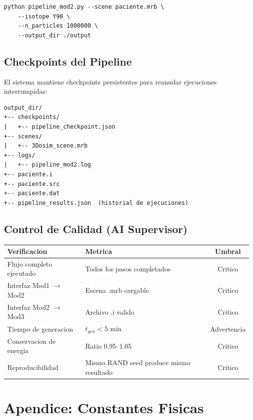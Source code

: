 \documentclass[12pt,a4paper]{article}
\begin{document}
\begin{verbatim}
python pipeline_mod2.py --scene paciente.mrb \
    --isotope Y90 \
    --n_particles 1000000 \
    --output_dir ./output
\end{verbatim}

\subsection{Checkpoints del Pipeline}

El sistema mantiene checkpoints persistentes para reanudar ejecuciones interrumpidas:

\begin{verbatim}
output_dir/
+-- checkpoints/
|   +-- pipeline_checkpoint.json
+-- scenes/
|   +-- 3Dosim_scene.mrb
+-- logs/
|   +-- pipeline_mod2.log
+-- paciente.i
+-- paciente.src
+-- paciente.dat
+-- pipeline_results.json  (historial de ejecuciones)
\end{verbatim}

\subsection{Control de Calidad (AI Supervisor)}

\begin{table}[H]
\centering
\begin{tabular}{llc}
\toprule
\textbf{Verificacion} & \textbf{Metrica} & \textbf{Umbral} \\
\midrule
Flujo completo ejecutado & Todos los pasos completados & Critico \\
Interfaz Mod1 $\to$ Mod2 & Escena .mrb cargable & Critico \\
Interfaz Mod2 $\to$ Mod3 & Archivo .i valido & Critico \\
Tiempo de generacion & $t_{gen} < 5$ min & Advertencia \\
Conservacion de energia & Ratio 0.95--1.05 & Critico \\
Reproducibilidad & Mismo RAND seed produce mismo resultado & Critico \\
\bottomrule
\end{tabular}
\end{table}

\newpage

\section*{Apendice: Constantes Fisicas}
\end{document}
